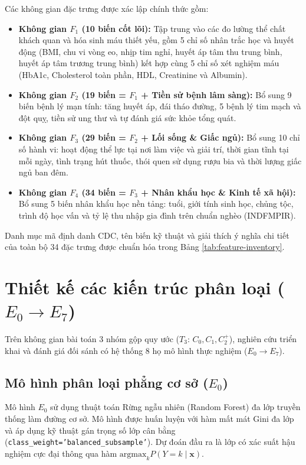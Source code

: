 Các không gian đặc trưng được xác lập chính thức gồm:
\begin{itemize}
    \item \textbf{Không gian $F_1$ (10 biến cốt lõi):} Tập trung vào các đo lường thể chất khách quan và hóa sinh máu thiết yếu, gồm 5 chỉ số nhân trắc học và huyết động (BMI, chu vi vòng eo, nhịp tim nghỉ, huyết áp tâm thu trung bình, huyết áp tâm trương trung bình) kết hợp cùng 5 chỉ số xét nghiệm máu (HbA1c, Cholesterol toàn phần, HDL, Creatinine và Albumin).
    \item \textbf{Không gian $F_2$ (19 biến = $F_1$ + Tiền sử bệnh lâm sàng):} Bổ sung 9 biến bệnh lý mạn tính: tăng huyết áp, đái tháo đường, 5 bệnh lý tim mạch và đột quỵ, tiền sử ung thư và tự đánh giá sức khỏe tổng quát.
    \item \textbf{Không gian $F_3$ (29 biến = $F_2$ + Lối sống \& Giấc ngủ):} Bổ sung 10 chỉ số hành vi: hoạt động thể lực tại nơi làm việc và giải trí, thời gian tĩnh tại mỗi ngày, tình trạng hút thuốc, thói quen sử dụng rượu bia và thời lượng giấc ngủ ban đêm.
    \item \textbf{Không gian $F_4$ (34 biến = $F_3$ + Nhân khẩu học \& Kinh tế xã hội):} Bổ sung 5 biến nhân khẩu học nền tảng: tuổi, giới tính sinh học, chủng tộc, trình độ học vấn và tỷ lệ thu nhập gia đình trên chuẩn nghèo (INDFMPIR).
\end{itemize}

Danh mục mã định danh CDC, tên biến kỹ thuật và giải thích ý nghĩa chi tiết của toàn bộ 34 đặc trưng được chuẩn hóa trong Bảng \ref{tab:feature-inventory}.



\section{Thiết kế các kiến trúc phân loại ($E_0 \to E_7$)}
\label{sec:thiet-ke-kien-truc-mo-hinh}

Trên không gian bài toán 3 nhóm gộp quy ước ($T_3$: $C_0, C_1, C_2^+$), nghiên cứu triển khai và đánh giá đối sánh có hệ thống 8 họ mô hình thực nghiệm ($E_0 \to E_7$).

\subsection{Mô hình phân loại phẳng cơ sở ($E_0$)}
\label{subsec:e0-flat}

Mô hình $E_0$ sử dụng thuật toán Rừng ngẫu nhiên (Random Forest) đa lớp truyền thống làm đường cơ sở. Mô hình được huấn luyện với hàm mất mát Gini đa lớp và áp dụng kỹ thuật gán trọng số lớp cân bằng (\texttt{class\_weight='balanced\_subsample'}). Dự đoán đầu ra là lớp có xác suất hậu nghiệm cực đại thông qua hàm $\text{argmax}_k P(Y=k \mid \mathbf{x})$.

